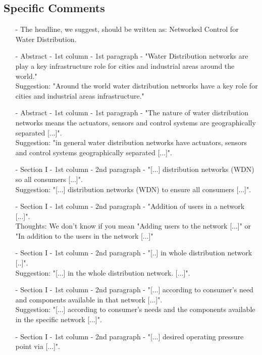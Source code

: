 \subsection{Specific Comments}
\begin{itemize}
\item[-]The headline, we suggest, should be written as: Networked Control for Water Distribution.
\item[-]Abstract - 1st column - 1st paragraph - "Water Distribution networks are play a key infrastructure role for cities and industrial areas around the world."\\
Suggestion: "Around the world water distribution networks have a key role for cities and industrial areas infrastructure."\\
\item[-]Abstract - 1st column - 1st paragraph - "The nature of water distribution networks means the actuators, sensors and control systems are geographically separated [...]".\\
Suggestion: "in general water distribution networks have actuators, sensors and control systems geographically separated [...]".\\
\item[-]Section I - 1st column - 2nd paragraph - "[...] distribution networks (WDN) so all consumers [...]".\\
Suggestion: "[...] distribution networks (WDN) to ensure all consumers [...]".\\
\item[-] Section I - 1st column - 2nd paragraph - "Addition of users in a network [...]".\\
Thoughts: We don't know if you mean "Adding  users to the network [...]" or "In addition to the users in the network [...]" \\
\item[-]Section I - 1st column - 2nd paragraph - "[..] in whole distribution network [..]".\\
Suggestion: "[...] in the whole distribution network. [...]".\\
\item[-]Section I - 1st column - 2nd paragraph - "[...] according to consumer's need and components available in that network [...]".\\
Suggestion: "[...] according to  consumer's needs and the components available in the specific network [...]".\\
\item[-]Section I - 1st column - 2nd paragraph - "[...] desired operating pressure point via [...]".\\

\end{itemize}
